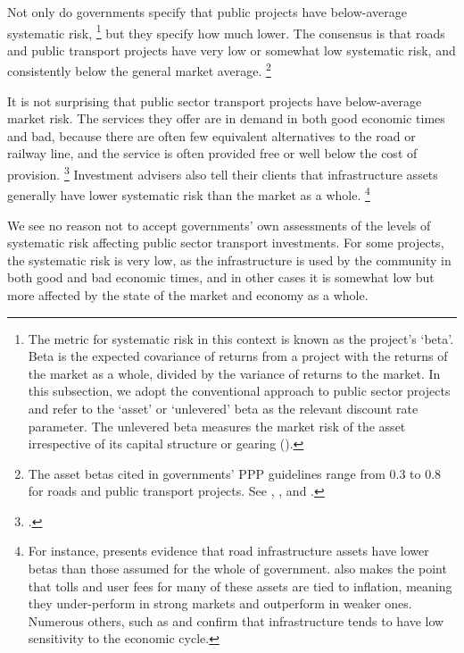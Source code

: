 \documentclass{grattan}
\begin{document}
Not only do governments specify that public projects have below-average systematic risk,%
    \footnote{The metric for systematic risk in this context is known as the project’s `beta'. Beta is the expected covariance of returns from a project with the returns of the market as a whole, divided by the variance of returns to the market. In this subsection, we adopt the conventional approach to public sector projects and refer to the `asset' or `unlevered' beta as the relevant discount rate parameter. The unlevered beta measures the market risk of the asset irrespective of its capital structure or gearing (\textcite[][17]{Commonwealth-government-2008-PPP-guidelines}).} 
but they specify how much lower. The consensus is that roads and public transport projects have very low or somewhat low systematic risk, and consistently below the general market average.%
    \footnote{The asset betas cited in governments' PPP guidelines range from 0.3 to 0.8 for roads and public transport projects. See \textcite[][18]{Partnerships-Victoria-2003-discount-rate-guidelines}, \textcite[][21]{Sth-Aust-2014-guidelines-for-economic-evaluation}, \textcite[][24]{Commonwealth-government-2008-PPP-guidelines} and \textcite[][3]{NZ-Treasury-discount-rates-for-CBA}.}

It is not surprising that public sector transport projects have below-average market risk. The services they offer are in demand in both good economic times and bad, because there are often few equivalent alternatives to the road or railway line, and the service is often provided free or well below the cost of provision.%
    \footcites[][108--110]{Damodaran-Valuation}[][48--54]{Commonwealth-government-2008-PPP-guidelines}
Investment advisers also tell their clients that infrastructure assets generally have lower systematic risk than the market as a whole.%
    \footnote{For instance, \textcite[][34]{Allen-Consulting-2004-NZ-report} presents evidence that road infrastructure assets have lower betas than those assumed for the whole of government. \textcite{Russell-Research-infrastructure} also makes the point that tolls and user fees for many of these assets are tied to inflation, meaning they under-perform in strong markets and outperform in weaker ones. Numerous others, such as \textcite{Colonial-First-State-infrastructure} and \textcite{Sequoia-equity-betas} confirm that infrastructure tends to have low sensitivity to the economic cycle.}

We see no reason not to accept governments' own assessments of the levels of systematic risk affecting public sector transport investments. For some projects, the systematic risk is very low, as the infrastructure is used by the community in both good and bad economic times, and in other cases it is somewhat low but more affected by the state of the market and economy as a whole. 
\end{document}
